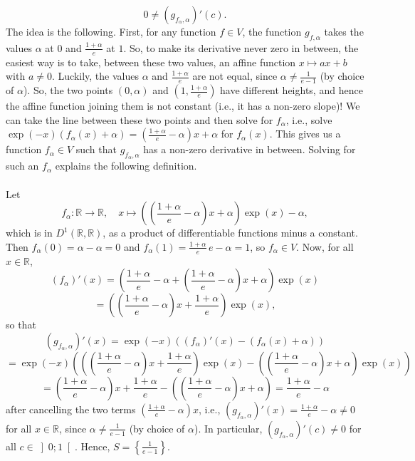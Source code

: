 \begin{solution}
    \[
        0 \neq \left(g_{f_\alpha,\alpha}\right)'\left(c\right).
    \]
    The idea is the following. First, for any function \( f \in V \), the function \( g_{f,\alpha} \) takes the values \( \alpha \) at \( 0 \) and \( \frac{1+\alpha}{e} \) at \( 1 \). So, to make its derivative never zero in between, the easiest way is to take, between these two values, an affine function \( x \longmapsto ax+b \) with \( a \neq 0 \). Luckily, the values \( \alpha \) and \( \frac{1+\alpha}{e} \) are not equal, since \( \alpha \neq \frac{1}{e-1} \) (by choice of \( \alpha \)). So, the two points \( \left(0,\alpha\right) \) and \( \left(1,\frac{1+\alpha}{e}\right) \) have different heights, and hence the affine function joining them is not constant (i.e., it has a non-zero slope)! We can take the line between these two points and then solve for \( f_\alpha \), i.e., solve \( \exp\left(-x\right)\left(f_\alpha\left(x\right)+\alpha\right) = \left(\frac{1+\alpha}{e}-\alpha\right)x+\alpha \) for \( f_\alpha\left(x\right) \). This gives us a function \( f_\alpha \in V \) such that \( g_{f_\alpha,\alpha} \) has a non-zero derivative in between. Solving for such an \( f_\alpha \) explains the following definition.
    \\\\
    Let
    \[
        f_\alpha \colon \mathbb{R} \longrightarrow \mathbb{R}, \quad x \longmapsto \left(\left(\frac{1+\alpha}{e}-\alpha\right)x+\alpha\right)\exp\left(x\right)-\alpha,
    \]
    which is in \( D^1\left(\mathbb{R},\mathbb{R}\right) \), as a product of differentiable functions minus a constant. Then \( f_\alpha\left(0\right) = \alpha-\alpha = 0 \) and \( f_\alpha\left(1\right) = \frac{1+\alpha}{e}\,e-\alpha = 1 \), so \( f_\alpha \in V \). Now, for all \( x \in \mathbb{R} \),
    \[
        \left(f_\alpha\right)'\left(x\right) = \left(\frac{1+\alpha}{e}-\alpha+\left(\frac{1+\alpha}{e}-\alpha\right)x+\alpha\right)\exp\left(x\right)
    \]
    \[
        = \left(\left(\frac{1+\alpha}{e}-\alpha\right)x+\frac{1+\alpha}{e}\right)\exp\left(x\right),
    \]
    so that
    \[
        \left(g_{f_\alpha,\alpha}\right)'\left(x\right) = \exp\left(-x\right)\left(\left(f_\alpha\right)'\left(x\right)-\left(f_\alpha\left(x\right)+\alpha\right)\right)
    \]
    \[
        = \exp\left(-x\right)\left(\left(\left(\frac{1+\alpha}{e}-\alpha\right)x+\frac{1+\alpha}{e}\right)\exp\left(x\right)-\left(\left(\frac{1+\alpha}{e}-\alpha\right)x+\alpha\right)\exp\left(x\right)\right)
    \]
    \[
        = \left(\frac{1+\alpha}{e}-\alpha\right)x+\frac{1+\alpha}{e}-\left(\left(\frac{1+\alpha}{e}-\alpha\right)x+\alpha\right) = \frac{1+\alpha}{e}-\alpha
    \]
    after cancelling the two terms \( \left(\frac{1+\alpha}{e}-\alpha\right)x \), i.e., \( \left(g_{f_\alpha,\alpha}\right)'\left(x\right) = \frac{1+\alpha}{e}-\alpha \neq 0 \) for all \( x \in \mathbb{R} \), since \( \alpha \neq \frac{1}{e-1} \) (by choice of \( \alpha \)). In particular, \( \left(g_{f_\alpha,\alpha}\right)'\left(c\right) \neq 0 \) for all \( c \in \left]0;1\right[ \). Hence, \( S = \left\{\frac{1}{e-1}\right\} \).
\end{solution}
